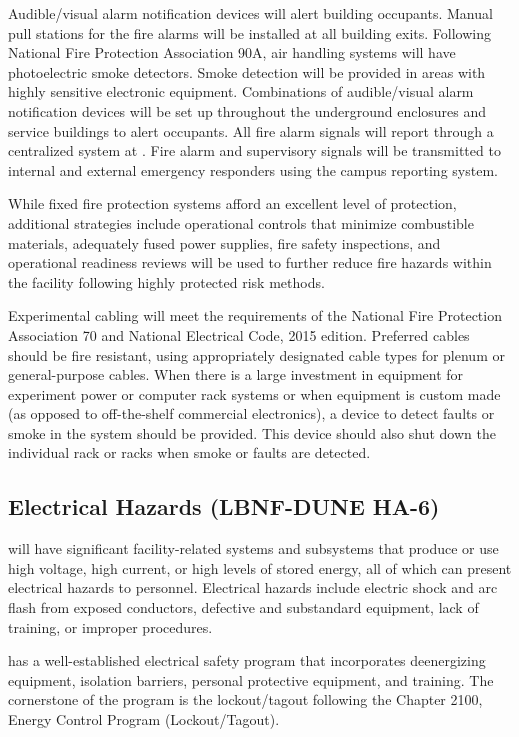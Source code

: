 Audible/visual alarm notification devices will alert building
occupants.  Manual pull stations for the fire alarms will be installed
at all building exits.  Following National Fire Protection Association
90A, air handling systems will have photoelectric smoke detectors.
Smoke detection will be provided in areas with highly sensitive
electronic equipment.  Combinations of audible/visual alarm
notification devices will be set up throughout the underground
enclosures and service buildings to alert occupants. All fire alarm
signals will report through a centralized system at .
Fire alarm and supervisory signals will be transmitted to internal and
external emergency responders using the campus reporting system.

While fixed fire protection systems afford an excellent level
of protection, additional strategies include operational controls
that minimize combustible materials, adequately
fused power supplies, fire safety inspections, and operational
readiness reviews will be used to further reduce fire hazards
within the facility following  highly protected risk methods.

Experimental cabling will meet the requirements of the National Fire
Protection Association 70 and National Electrical Code, 2015 edition.
Preferred cables should be fire resistant, using appropriately
designated cable types for plenum or general-purpose cables.  When
there is a large investment in equipment for experiment power or
computer rack systems or when equipment is custom made (as opposed to
off-the-shelf commercial electronics), a device to detect faults or
smoke in the system should be provided.  This device should also shut
down the individual rack or racks when smoke or faults are detected.


\subsection{Electrical Hazards (LBNF-DUNE HA-6)}

 will have significant facility-related
systems and subsystems that produce or use high voltage, high current,
or high levels of stored energy, all of which can present electrical
hazards to personnel. Electrical hazards include electric shock and
arc flash from exposed conductors, defective and substandard
equipment, lack of training, or improper procedures.

\fnal has a well-established electrical safety program that
incorporates deenergizing equipment, isolation barriers, personal
protective equipment, and training. The cornerstone of the program is
the lockout/tagout following the  Chapter 2100, \fnal
Energy Control Program (Lockout/Tagout).

